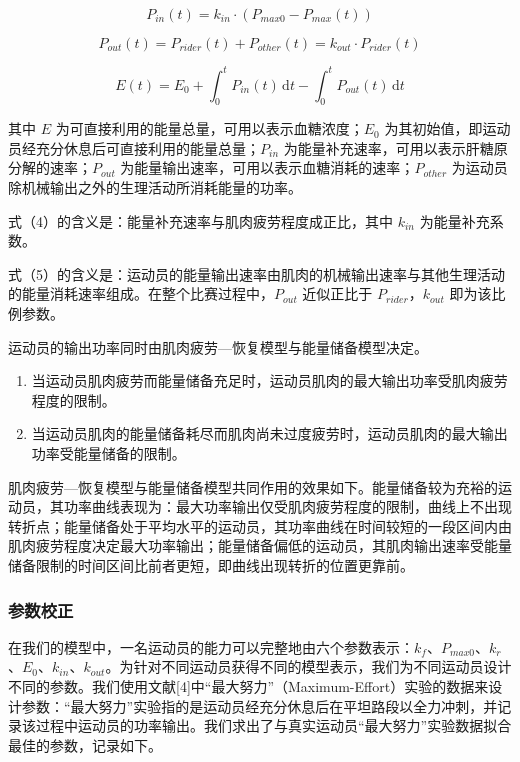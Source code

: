 \documentclass[11pt,a4paper]{ctexart}
\begin{document}
\begin{equation}
P_{in}(t)=k_{in}\cdot\left(P_{max0}-P_{max}(t)\right)
\end{equation}

\begin{equation}
P_{out}(t)=P_{rider}(t)+P_{other}(t)=k_{out}\cdot P_{rider}(t)
\end{equation}

\begin{equation}
E(t)=E_0+\int_{0}^{t}P_{in}(t)\,\mathrm{d}t-\int_{0}^{t}P_{out}(t)\,\mathrm{d}t
\end{equation}

其中 $E$ 为可直接利用的能量总量，可用以表示血糖浓度；$E_0$ 为其初始值，即运动员经充分休息后可直接利用的能量总量；$P_{in}$ 为能量补充速率，可用以表示肝糖原分解的速率；$P_{out}$ 为能量输出速率，可用以表示血糖消耗的速率；$P_{other}$ 为运动员除机械输出之外的生理活动所消耗能量的功率。

式（4）的含义是：能量补充速率与肌肉疲劳程度成正比，其中 $k_{in}$ 为能量补充系数。

式（5）的含义是：运动员的能量输出速率由肌肉的机械输出速率与其他生理活动的能量消耗速率组成。在整个比赛过程中，$P_{out}$ 近似正比于 $P_{rider}$，$k_{out}$ 即为该比例参数。

运动员的输出功率同时由肌肉疲劳—恢复模型与能量储备模型决定。

\begin{enumerate}
\item 当运动员肌肉疲劳而能量储备充足时，运动员肌肉的最大输出功率受肌肉疲劳程度的限制。
\item 当运动员肌肉的能量储备耗尽而肌肉尚未过度疲劳时，运动员肌肉的最大输出功率受能量储备的限制。
\end{enumerate}

肌肉疲劳—恢复模型与能量储备模型共同作用的效果如下。能量储备较为充裕的运动员，其功率曲线表现为：最大功率输出仅受肌肉疲劳程度的限制，曲线上不出现转折点；能量储备处于平均水平的运动员，其功率曲线在时间较短的一段区间内由肌肉疲劳程度决定最大功率输出；能量储备偏低的运动员，其肌肉输出速率受能量储备限制的时间区间比前者更短，即曲线出现转折的位置更靠前。

\subsubsection{参数校正}

在我们的模型中，一名运动员的能力可以完整地由六个参数表示：$k_f$、$P_{max0}$、$k_r$、$E_0$、$k_{in}$、$k_{out}$。为针对不同运动员获得不同的模型表示，我们为不同运动员设计不同的参数。我们使用文献[4]中“最大努力”（Maximum-Effort）实验的数据来设计参数：“最大努力”实验指的是运动员经充分休息后在平坦路段以全力冲刺，并记录该过程中运动员的功率输出。我们求出了与真实运动员“最大努力”实验数据拟合最佳的参数，记录如下。
\end{document}
